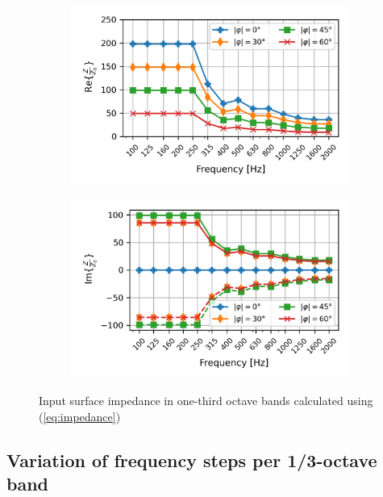 \begin{figure}[H]
	\centering
	\begin{subfigure}[b]{0.8\textwidth}
		\centering
		\includegraphics{fig/chap4/impedance/impedance_real.png}
	\end{subfigure}
	\begin{subfigure}[b]{0.8\textwidth}
		\centering
		\includegraphics{fig/chap4/impedance/impedance_imag.png}
	\end{subfigure}
	\caption{Input surface impedance in one-third octave bands calculated using (\ref{eq:impedance})}
\end{figure}

\newpage
\subsection{Variation of frequency steps per 1/3-octave band}


